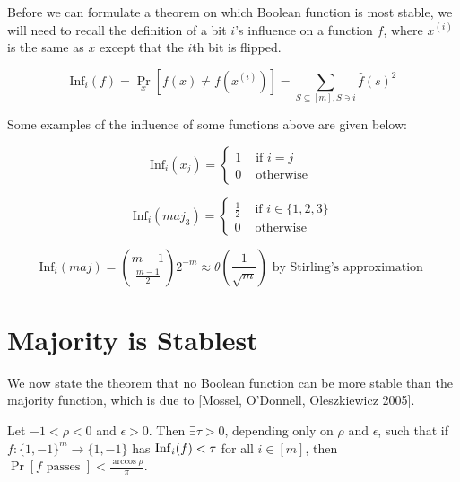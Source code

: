 \documentclass[12pt]{article}
\begin{document}
Before we can formulate a theorem on which Boolean function is most
stable, we will need to
recall the definition of a bit $i$'s influence on a function $f$, where
$x^{(i)}$ is the same as $x$ except that the $i$th bit is flipped.

\begin{equation}
\textrm{Inf}_i(f) = \Pr_x\left[f(x) \ne f(x^{(i)}) \right] = \sum_{S \subseteq [m], S \ni i}{\hat{f}(s)^2}
\end{equation}

Some examples of the influence of some functions above are given below:

\begin{equation}
\textrm{Inf}_i(x_j) = \left\{ \begin{array}{ll}
1 & \textrm{ if } i = j\\
0 & \textrm{ otherwise }
\end{array} \right.\end{equation}

\begin{equation}
\textrm{Inf}_i(maj_3) = \left\{ \begin{array}{ll}
\frac{1}{2} & \textrm{ if } i \in \{1,2,3\}\\
0 & \textrm{ otherwise }
\end{array} \right.\end{equation}

\begin{equation}
\textrm{Inf}_i(maj) = \binom{m-1}{\frac{m-1}{2}}2^{-m} \approx \theta(\frac{1}{\sqrt{m}}) \textrm{ by Stirling's approximation }
\end{equation}

\section{Majority is Stablest}

We now state the theorem that no Boolean function can be more stable than
the majority function, which is due to [Mossel, O'Donnell, Oleszkiewicz 2005].

\begin{theorem}
Let $-1 < \rho < 0$ and $\epsilon > 0$. Then $\exists \tau > 0$, depending
only on $\rho$ and $\epsilon$, such that if $f:\{1,-1\}^m \rightarrow \{1,-1\}$
has $\mathop{\rm {Inf}}_i(f) < \tau$ for all $i \in [m]$, then $\Pr\left[ f \textrm{ passes }\right] < \frac{\arccos{\rho}}{\pi}$.
\end{theorem}
\end{document}
